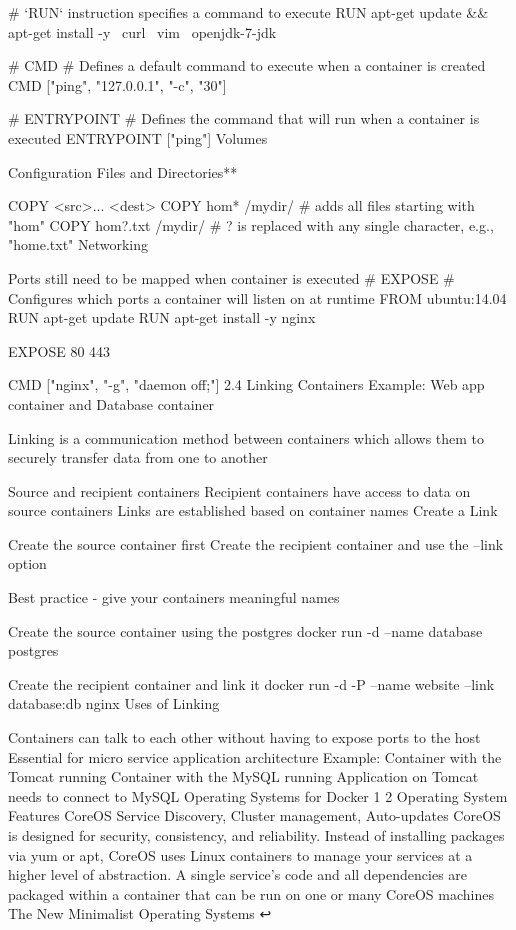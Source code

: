 # `RUN` instruction specifies a command to execute
RUN apt-get update && apt-get install -y \
      curl \
      vim \
      openjdk-7-jdk

# CMD
# Defines a default command to execute when a container is created
CMD ["ping", "127.0.0.1", "-c", "30"]

# ENTRYPOINT
# Defines the command that will run when a container is executed
ENTRYPOINT ["ping"]
Volumes

Configuration Files and Directories**

COPY <src>... <dest>
COPY hom* /mydir/        # adds all files starting with "hom"
COPY hom?.txt /mydir/    # ? is replaced with any single character, e.g., "home.txt"
Networking

Ports still need to be mapped when container is executed
# EXPOSE
# Configures which ports a container will listen on at runtime
FROM ubuntu:14.04
RUN apt-get update
RUN apt-get install -y nginx

EXPOSE 80 443

CMD ["nginx", "-g", "daemon off;"]
2.4 Linking Containers
Example: Web app container and Database container

Linking is a communication method between containers which allows them to securely transfer data from one to another

Source and recipient containers
Recipient containers have access to data on source containers
Links are established based on container names
Create a Link

Create the source container first
Create the recipient container and use the --link option

Best practice - give your containers meaningful names

Create the source container using the postgres
docker run -d --name database postgres

Create the recipient container and link it
docker run -d -P --name website --link database:db nginx
Uses of Linking

Containers can talk to each other without having to expose ports to the host
Essential for micro service application architecture
Example:
Container with the Tomcat running
Container with the MySQL running
Application on Tomcat needs to connect to MySQL
Operating Systems for Docker 1 2
Operating System	Features
CoreOS	Service Discovery, Cluster management, Auto-updates
CoreOS is designed for security, consistency, and reliability. Instead of installing packages via yum or apt, CoreOS uses Linux containers to manage your services at a higher level of abstraction. A single service’s code and all dependencies are packaged within a container that can be run on one or many CoreOS machines
The New Minimalist Operating Systems ↩

